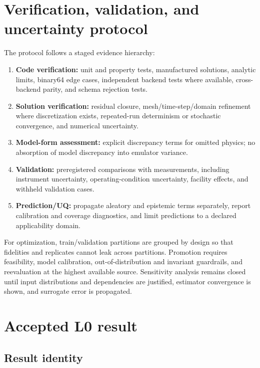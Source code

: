 \documentclass[11pt]{article}
\begin{document}
\section{Verification, validation, and uncertainty protocol}

The protocol follows a staged evidence hierarchy:
\begin{enumerate}
  \item \textbf{Code verification:} unit and property tests, manufactured
        solutions, analytic limits, binary64 edge cases, independent backend
        tests where available, cross-backend parity, and schema rejection tests.
  \item \textbf{Solution verification:} residual closure, mesh/time-step/domain
        refinement where discretization exists, repeated-run determinism or
        stochastic convergence, and numerical uncertainty.
  \item \textbf{Model-form assessment:} explicit discrepancy terms for omitted
        physics; no absorption of model discrepancy into emulator variance.
  \item \textbf{Validation:} preregistered comparisons with measurements,
        including instrument uncertainty, operating-condition uncertainty,
        facility effects, and withheld validation cases.
  \item \textbf{Prediction/UQ:} propagate aleatory and epistemic terms
        separately, report calibration and coverage diagnostics, and limit
        predictions to a declared applicability domain.
\end{enumerate}

For optimization, train/validation partitions are grouped by design so that
fidelities and replicates cannot leak across partitions. Promotion requires
feasibility, model calibration, out-of-distribution and invariant guardrails,
and reevaluation at the highest available source. Sensitivity analysis remains
closed until input distributions and dependencies are justified, estimator
convergence is shown, and surrogate error is propagated.

\section{Accepted L0 result}

\subsection{Result identity}
\end{document}
